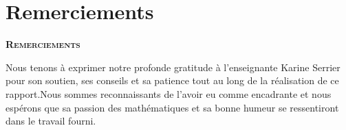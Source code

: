 \section*{Remerciements}

\begin{center}
	\textsc{{\bf Remerciements}}
\end{center}
Nous tenons à exprimer notre profonde gratitude à l’enseignante Karine Serrier pour son soutien, ses conseils et sa patience tout au long de la réalisation de ce rapport.Nous sommes reconnaissants de l’avoir eu comme encadrante et nous espérons que sa passion des mathématiques et sa bonne humeur se ressentiront dans le travail fourni.
